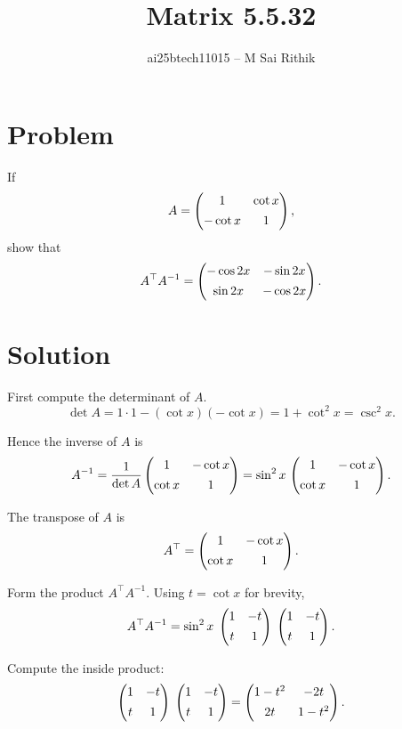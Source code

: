 \documentclass[12pt]{article}
\title{Matrix 5.5.32}
\author{ai25btech11015 -- M Sai Rithik}
\date{}
\begin{document}
\maketitle

\section*{Problem}
If
\begin{equation}
A=\begin{pmatrix}1 & \cot x \\[4pt] -\cot x & 1 \end{pmatrix},
\end{equation}
show that
\begin{equation}
A^{\top}A^{-1}=\begin{pmatrix} -\cos2x & -\sin2x \\[4pt] \sin2x & -\cos2x \end{pmatrix}.
\end{equation}

\section*{Solution}

First compute the determinant of \(A\).
\begin{equation}
\det A = 1\cdot 1 - (\cot x)(-\cot x)
= 1 + \cot^2 x = \csc^2 x.
\end{equation}

Hence the inverse of \(A\) is
\begin{equation}
A^{-1} = \frac{1}{\det A}\begin{pmatrix}1 & -\cot x \\[4pt] \cot x & 1\end{pmatrix}
= \sin^2 x \,\begin{pmatrix}1 & -\cot x \\[4pt] \cot x & 1\end{pmatrix}.
\end{equation}

The transpose of \(A\) is
\begin{equation}
A^{\top}=\begin{pmatrix}1 & -\cot x \\[4pt] \cot x & 1\end{pmatrix}.
\end{equation}

Form the product \(A^{\top}A^{-1}\). Using \(t=\cot x\) for brevity,
\begin{equation}
A^{\top}A^{-1}
= \sin^2 x \;\begin{pmatrix}1 & -t \\[4pt] t & 1\end{pmatrix}\;\begin{pmatrix}1 & -t \\[4pt] t & 1\end{pmatrix}.
\end{equation}

Compute the inside product:
\begin{equation}
\begin{pmatrix}1 & -t \\[4pt] t & 1\end{pmatrix}\;\begin{pmatrix}1 & -t \\[4pt] t & 1\end{pmatrix}
= \begin{pmatrix}1-t^2 & -2t \\[4pt] 2t & 1-t^2 \end{pmatrix}.
\end{equation}
\end{document}
